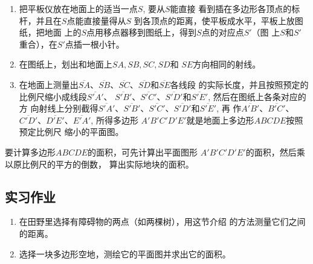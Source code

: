 \begin{enumerate}
    \item 把平板仪放在地面上的适当一点$S$, 要从$S$能直接
看到插在多边形各顶点的标杆，并且在$S$点能直接量得从$S$
到各顶点的距离，使平板成水平，平板上放图纸，把地面
上的$S$点用移点器移到图纸上，得到$S$点的对应点$S'$（图
上$S$和$S'$重合），在$S'$点插一根小针。

\item 在图纸上，划出和地面上$SA,SB,SC,SD$和
$SE$方向相同的射线。
\item 在地面上测量出$\overline{SA}$、$\overline{SB}$、$\overline{SC}$、$\overline{SD}$和$\overline{SE}$各线段
的实际长度，并且按照预定的比例尺缩小成线段$\overline{S'A'}$、
$\overline{S'B'}$、$\overline{S'C'}$、$\overline{S'D'}$和$\overline{S'E'}$, 然后在图纸上各条对应的方
向射线上分别截得$\overline{S'A'}$、$\overline{S'B'}$、$\overline{S'C'}$、$\overline{S'D'}$和$\overline{S'E'}$, 再
作$\overline{A'B'}$、$\overline{B'C'}$、$\overline{C'D'}$、$\overline{D'E'}$、$\overline{E'A'}$, 所得多边形
$A'B'C'D'E'$就是地面上多边形$ABCDE$按照预定比例尺
缩小的平面图。
\end{enumerate}

要计算多边形$ABCDE$的面积，可先计算出平面图形
$A'B'C'D'E'$的面积，然后乘以原比例尺的平方的倒数，
算出实际地块的面积。































\subsection*{实习作业}
\begin{enumerate}
    \item 在田野里选择有障碍物的两点（如两棵树），用这节介绍
    的方法测量它们之间的距离。
    \item 选择一块多边形空地，测绘它的平面图并求出它的面积。
\end{enumerate}

